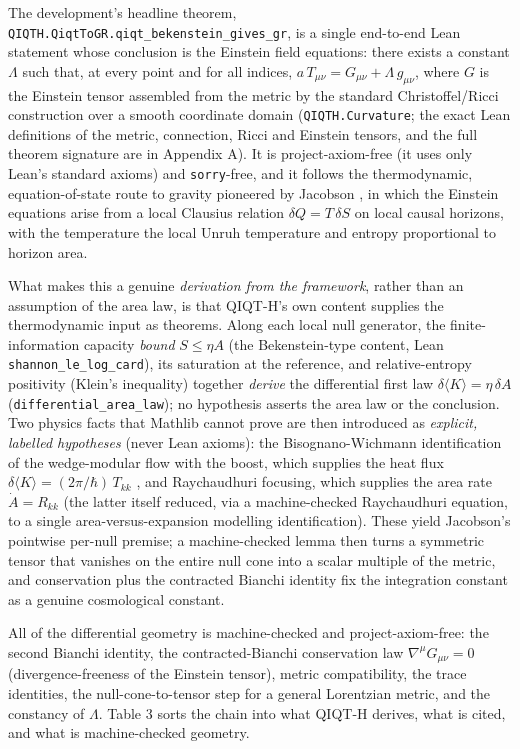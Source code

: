\documentclass[11pt]{article}
\begin{document}
The development's headline theorem, \texttt{QIQTH.QiqtToGR.qiqt\_bekenstein\_gives\_gr}, is a single
end-to-end Lean statement whose conclusion is the Einstein field equations: there exists a constant
$\Lambda$ such that, at every point and for all indices, $a\,T_{\mu\nu}=G_{\mu\nu}+\Lambda\,g_{\mu\nu}$,
where $G$ is the Einstein tensor assembled from the metric by the standard Christoffel/Ricci
construction over a smooth coordinate domain (\texttt{QIQTH.Curvature}; the exact Lean definitions of the
metric, connection, Ricci and Einstein tensors, and the full theorem signature are in Appendix A).
It is project-axiom-free (it uses only Lean's standard axioms) and \texttt{sorry}-free,
and it follows the thermodynamic, equation-of-state route to gravity pioneered by Jacobson \cite{r46},
in which the Einstein equations arise from a local Clausius relation $\delta Q=T\,\delta S$ on local
causal horizons, with the temperature the local Unruh temperature \cite{r48} and entropy proportional
to horizon area.

What makes this a genuine \emph{derivation from the framework}, rather than an assumption of the area
law, is that QIQT-H's own content supplies the thermodynamic input as theorems. Along each local null
generator, the finite-information capacity \emph{bound} $S\le\eta A$ (the Bekenstein-type content,
Lean \texttt{shannon\_le\_log\_card}), its saturation at the reference, and relative-entropy positivity
(Klein's inequality) together \emph{derive} the differential first law $\delta\langle K\rangle=\eta\,\delta A$
(\texttt{differential\_area\_law}); no hypothesis asserts the area law or the conclusion. Two
physics facts that Mathlib cannot prove are then introduced as \emph{explicit, labelled hypotheses}
(never Lean axioms): the Bisognano-Wichmann identification of the wedge-modular flow with the boost,
which supplies the heat flux $\delta\langle K\rangle=(2\pi/\hbar)\,T_{kk}$ \cite{r47}, and Raychaudhuri
focusing, which supplies the area rate $\dot{A}=R_{kk}$ \cite{r49} (the latter itself reduced, via a
machine-checked Raychaudhuri equation, to a single area-versus-expansion modelling identification).
These yield Jacobson's pointwise per-null premise; a machine-checked lemma then turns a symmetric
tensor that vanishes on the entire null cone into a scalar multiple of the metric, and conservation
plus the contracted Bianchi identity fix the integration constant as a genuine cosmological constant.

All of the differential geometry is machine-checked and project-axiom-free: the second Bianchi
identity, the contracted-Bianchi conservation law $\nabla^\mu G_{\mu\nu}=0$ (divergence-freeness of the Einstein
tensor), metric compatibility, the trace identities, the null-cone-to-tensor step for a general
Lorentzian metric, and the constancy of $\Lambda$. Table 3 sorts the chain into what
QIQT-H derives, what is cited, and what is machine-checked geometry.
\end{document}
